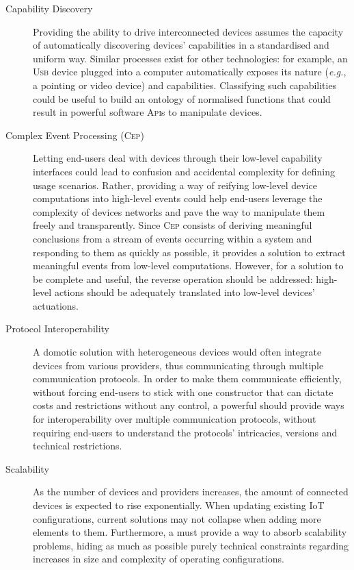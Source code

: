 \begin{description}
	\item[Capability Discovery] Providing the ability to drive interconnected devices assumes the capacity of automatically discovering devices' capabilities in a standardised and uniform way. Similar processes exist for other technologies: for example, an \textsc{Usb} device plugged into a computer automatically exposes its nature (\textit{e.g.}, a pointing or video device) and capabilities. Classifying such capabilities could be useful to build an ontology of normalised functions that could result in powerful software \textsc{Api}s to manipulate devices. 
		
	\item[Complex Event Processing (\textsc{Cep})] Letting end-users deal with devices through their low-level capability interfaces could lead to confusion and accidental complexity for defining usage scenarios. Rather, providing a way of reifying low-level device computations into high-level events could help end-users leverage the complexity of devices networks and pave the way to manipulate them freely and transparently. Since \textsc{Cep} consists of deriving meaningful conclusions from a stream of events occurring within a system and responding to them as quickly as possible, it provides a solution to extract meaningful events from low-level computations. However, for a solution to be complete and useful, the reverse operation should be addressed: high-level actions should be adequately translated into low-level devices' actuations. 
		
	\item[Protocol Interoperability] A domotic solution with heterogeneous devices would often integrate devices from various providers, thus communicating through multiple communication protocols. In order to make them communicate efficiently, without forcing end-users to stick with one constructor that can dictate costs and restrictions without any control, a powerful \DSL should provide ways for interoperability over multiple communication protocols, without requiring end-users to understand the protocols' intricacies, versions and technical restrictions.
	
	\item[Scalability] As the number of devices and providers increases, the amount of connected devices is expected to rise exponentially. When updating existing IoT configurations, current solutions may not collapse when adding more elements to them. Furthermore, a \DSL must provide a way to absorb scalability problems, hiding as much as possible purely technical constraints regarding increases in size and complexity of operating configurations. 
	

\end{description}
